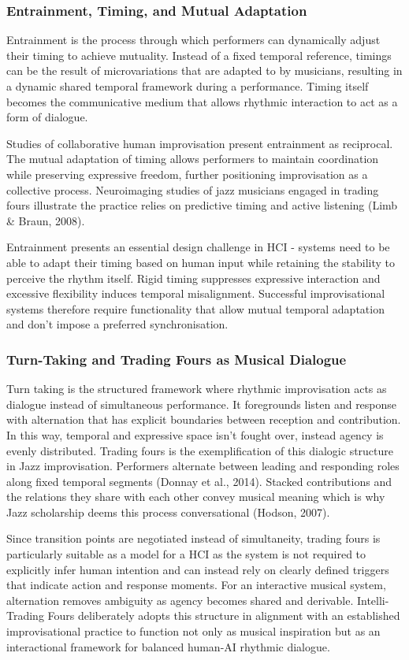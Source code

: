 \documentclass[11pt,a4paper]{article}
\begin{document}
\subsubsection{Entrainment, Timing, and Mutual Adaptation}
Entrainment is the process through which performers can dynamically adjust their timing to achieve mutuality. Instead of a fixed temporal reference, timings can be the result of microvariations that are adapted to by musicians, resulting in a dynamic shared temporal framework during a performance. Timing itself becomes the communicative medium that allows rhythmic interaction to act as a form of dialogue.

Studies of collaborative human improvisation present entrainment as reciprocal. The mutual adaptation of timing allows performers to maintain coordination while preserving expressive freedom, further positioning improvisation as a collective process. Neuroimaging studies of jazz musicians engaged in trading fours illustrate the practice relies on predictive timing and active listening (Limb \& Braun, 2008).

Entrainment presents an essential design challenge in HCI - systems need to be able to adapt their timing based on human input while retaining the stability to perceive the rhythm itself. Rigid timing suppresses expressive interaction and excessive flexibility induces temporal misalignment. Successful improvisational systems therefore require functionality that allow mutual temporal adaptation and don’t impose a preferred synchronisation. 

\subsubsection{Turn-Taking and Trading Fours as Musical Dialogue}
Turn taking is the structured framework where rhythmic improvisation acts as dialogue instead of simultaneous performance. It foregrounds listen and response with alternation that has explicit boundaries between reception and contribution. In this way, temporal and expressive space isn’t fought over, instead agency is evenly distributed. Trading fours is the exemplification of this dialogic structure in Jazz improvisation. Performers alternate between leading and responding roles along fixed temporal segments (Donnay et al., 2014).  Stacked contributions and the relations they share with each other convey musical meaning which is why Jazz scholarship deems this process conversational (Hodson, 2007).

Since transition points are negotiated instead of simultaneity, trading fours is particularly suitable as a model for a HCI as the system is not required to explicitly infer human intention and can instead rely on clearly defined triggers that indicate action and response moments. For an interactive musical system, alternation removes ambiguity as agency becomes shared and derivable. Intelli-Trading Fours deliberately adopts this structure in alignment with an established improvisational practice to function not only as musical inspiration but as an interactional framework for balanced human-AI rhythmic dialogue.
\end{document}
